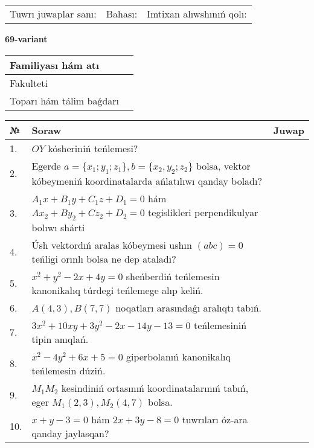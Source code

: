 \documentclass{article}
\begin{document}
\vspace{1cm}

\begin{tabular}{lll}
Tuwrı juwaplar sanı: \underline{\hspace{1.5cm}} & 
Bahası: \underline{\hspace{1.5cm}} & 
Imtixan alıwshınıń qolı: \underline{\hspace{2cm}} \\
\end{tabular}

\egroup

\newpage


\textbf{69-variant}\\

\bgroup
\def\arraystretch{1.6} %

\begin{tabular}{|m{5.7cm}|m{9.5cm}|}
\hline
Familiyası hám atı & \\
\hline
Fakulteti  & \\
\hline
Toparı hám tálim baǵdarı  & \\
\hline
\end{tabular}

\vspace{1cm}

\begin{tabular}{|m{0.7cm}|m{10cm}|m{4cm}|}
\hline
№ & Soraw & Juwap \\
\hline
1. & $OY$ kósheriniń teńlemesi? &  \\
\hline
2. & Egerde $a=\{ x_1; y_1; z_1\}, b=\{ x_2, y_2; z_2\}$ bolsa, vektor kóbeymeniń koordinatalarda ańlatılıwı qanday boladı? &  \\
\hline
3. & $A_1x+B_1y+C_1z+D_1=0$ hám $Ax_2+By_2+Cz_2+D_2=0$ tegislikleri perpendikulyar bolıwı shárti &  \\
\hline
4. & Úsh vektordıń aralas kóbeymesi ushın $(abc)=0$ teńligi orınlı bolsa ne dep ataladı? &  \\
\hline
5. & $x^{2}+y^{2}-2x+4y=0$ sheńberdiń teńlemesin kanonikalıq túrdegi teńlemege alıp keliń. &  \\
\hline
6. & $A(4, 3), B(7, 7)$ noqatları arasındaǵı aralıqtı tabıń. &  \\
\hline
7. & $3x^{2}+10xy+3y^{2}-2x-14y-13=0$ teńlemesiniń tipin anıqlań. &  \\
\hline
8. & $x^{2}-4y^{2}+6x+5=0$ giperbolanıń kanonikalıq teńlemesin dúziń. &  \\
\hline
9. & $M_{1}M_{2}$ kesindiniń ortasınıń koordinatalarınıń tabıń, eger $M_{1} (2, 3), M_{2} (4, 7)$ bolsa. &  \\
\hline
10. & $x+y-3=0$ hám $2x+3y-8=0$ tuwrıları óz-ara qanday jaylasqan? &  \\
\hline
\end{tabular}
\end{document}
